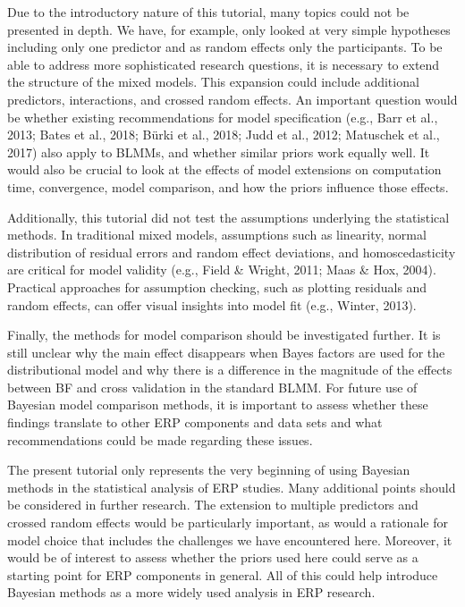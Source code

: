 \documentclass[
  doc,12pt,floatsintext]{apa7}
\begin{document}
Due to the introductory nature of this tutorial, many topics could not be presented in depth. We have, for example, only looked at very simple hypotheses including only one predictor and as random effects only the participants. To be able to address more sophisticated research questions, it is necessary to extend the structure of the mixed models. This expansion could include additional predictors, interactions, and crossed random effects. An important question would be whether existing recommendations for model specification (e.g., Barr et al., 2013; Bates et al., 2018; Bürki et al., 2018; Judd et al., 2012; Matuschek et al., 2017) also apply to BLMMs, and whether similar priors work equally well. It would also be crucial to look at the effects of model extensions on computation time, convergence, model comparison, and how the priors influence those effects.

Additionally, this tutorial did not test the assumptions underlying the statistical methods. In traditional mixed models, assumptions such as linearity, normal distribution of residual errors and random effect deviations, and homoscedasticity are critical for model validity (e.g., Field \& Wright, 2011; Maas \& Hox, 2004). Practical approaches for assumption checking, such as plotting residuals and random effects, can offer visual insights into model fit (e.g., Winter, 2013).

Finally, the methods for model comparison should be investigated further. It is still unclear why the main effect disappears when Bayes factors are used for the distributional model and why there is a difference in the magnitude of the effects between BF and cross validation in the standard BLMM. For future use of Bayesian model comparison methods, it is important to assess whether these findings translate to other ERP components and data sets and what recommendations could be made regarding these issues.

The present tutorial only represents the very beginning of using Bayesian methods in the statistical analysis of ERP studies. Many additional points should be considered in further research. The extension to multiple predictors and crossed random effects would be particularly important, as would a rationale for model choice that includes the challenges we have encountered here. Moreover, it would be of interest to assess whether the priors used here could serve as a starting point for ERP components in general. All of this could help introduce Bayesian methods as a more widely used analysis in ERP research.
\end{document}
